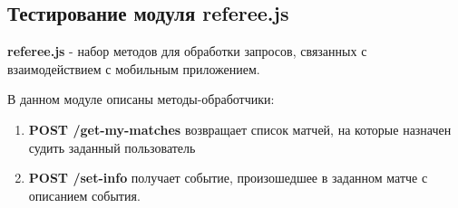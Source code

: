 \subsection{Тестирование модуля referee.js}
\label{subsec:referee-test}

\textbf{referee.js} - набор методов для обработки запросов, связанных с взаимодействием с мобильным приложением.

В данном модуле описаны методы-обработчики:
\begin{enumerate}
	\item \textbf{POST /get-my-matches} возвращает список матчей, на которые назначен судить заданный пользователь
	\item \textbf{POST /set-info} получает событие, произошедшее в заданном матче с описанием события.
\end{enumerate}

